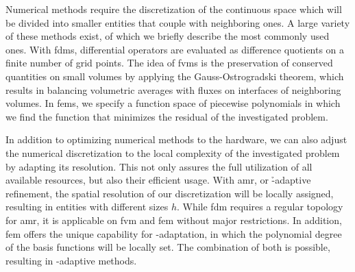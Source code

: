 Numerical methods require the discretization of the continuous space which will be divided into smaller entities that couple with neighboring ones. A large variety of these methods exist, of which we briefly describe the most commonly used ones.
With \glspl{fdm}, differential operators are evaluated as difference quotients on a finite number of grid points. %
The idea of \glspl{fvm} is the preservation of conserved quantities on small volumes by applying the Gauss-Ostrogradski theorem, which results in balancing volumetric averages with fluxes on interfaces of neighboring volumes.
In \glspl{fem}, we specify a function space of piecewise polynomials in which we find the function 
that minimizes the residual of the investigated problem.


In addition to optimizing numerical methods to the hardware, we can also adjust the numerical discretization to the local complexity of the investigated problem by adapting its resolution.
This not only assures the full utilization of all available resources, but also their efficient usage.
With \Gls{amr}, or \h-adaptive refinement, the spatial resolution of our discretization will be locally assigned, resulting in entities with different sizes $h$. While \gls{fdm} requires a regular topology for \gls{amr}, it is applicable on \gls{fvm} and \gls{fem} without major restrictions. In addition, \gls{fem} offers the unique capability for \p-adaptation, in which the polynomial degree of the basis functions will be locally set. The combination of both is possible, resulting in \hp-adaptive methods.

